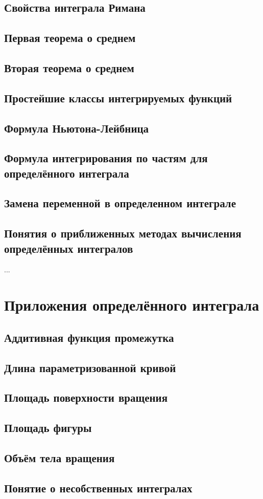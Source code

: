 \subsection{Свойства интеграла Римана}

\subsection{Первая теорема о среднем}

\subsection{Вторая теорема о среднем}
\subsection{Простейшие классы интегрируемых функций}
\subsection{Формула Ньютона-Лейбница}
\subsection{Формула интегрирования по частям для определённого интеграла}
\subsection{Замена переменной в определенном интеграле}
\subsection{Понятия о приближенных методах вычисления определённых интегралов}
...

\section{Приложения определённого интеграла}
\subsection{Аддитивная функция промежутка}

\subsection{Длина параметризованной кривой} 
\subsection{Площадь поверхности вращения}
\subsection{Площадь фигуры}
\subsection{Объём тела вращения}
\subsection{Понятие о несобственных интегралах}



